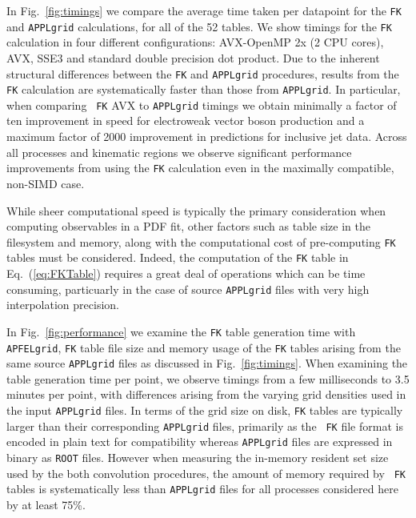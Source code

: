 \documentclass[preprint,12pt]{elsarticle}
\begin{document}
In Fig.~\ref{fig:timings} we compare the average time taken per
datapoint for the {\tt FK} and {\tt APPLgrid} calculations, for all of
the 52 tables. We show timings for the {\tt FK} calculation in four
different configurations: AVX-OpenMP 2x (2 CPU cores), AVX, SSE3 and
standard double precision dot product. Due to the inherent structural
differences between the {\tt FK} and {\tt APPLgrid} procedures,
results from the {\tt FK} calculation are systematically faster than
those from {\tt APPLgrid}. In particular, when comparing {\tt
  FK} AVX to {\tt APPLgrid} timings we obtain minimally a factor of
ten improvement in speed for electroweak vector boson production and a
maximum factor of 2000 improvement in predictions for inclusive jet
data. Across all processes and kinematic regions we observe
significant performance improvements from using the {\tt FK}
calculation even in the maximally compatible, non-SIMD case.

While sheer computational speed is typically the primary consideration
when com\-pu\-ting observables in a PDF fit, other factors such as
table size in the filesystem and memory, along with the computational
cost of pre-computing {\tt FK} tables must be considered. Indeed, the
computation of the {\tt FK} table in Eq.~(\ref{eq:FKTable}) requires a
great deal of operations which can be time consuming, particuarly in
the case of source {\tt APPLgrid} files with very high interpolation
precision.

In Fig.~\ref{fig:performance} we examine the {\tt FK} table generation
time with {\tt APFELgrid}, {\tt FK} table file size and memory usage
of the {\tt FK} tables arising from the same source {\tt APPLgrid}
files as discussed in Fig.~\ref{fig:timings}.  When examining the
table generation time per point, we observe timings from a few
milliseconds to 3.5 minutes per point, with differences arising from
the varying grid densities used in the input {\tt APPLgrid} files.  In
terms of the grid size on disk, {\tt FK} tables are typically larger
than their corresponding {\tt APPLgrid} files, primarily as the {\tt
  FK} file format is encoded in plain text for compatibility whereas
{\tt APPLgrid} files are expressed in binary as {\tt ROOT}
files. However when measuring the in-memory resident set size used by
the both convolution procedures, the amount of memory required by {\tt
  FK} tables is systematically less than {\tt APPLgrid} files for all
processes considered here by at least 75\%.

\end{document}
